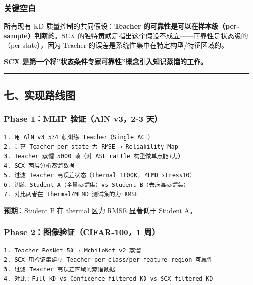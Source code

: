 \documentclass[
  12pt,
]{ctexart}
\begin{document}
\subsubsection{关键空白}\label{ux5173ux952eux7a7aux767d}

所有现有 KD 质量控制的共同假设：\textbf{Teacher
的可靠性是可以在样本级（per-sample）判断的}。SCX
的独特贡献是指出这个假设不成立------可靠性是状态级的（per-state），因为
Teacher 的误差是系统性集中在特定构型/特征区域的。

\textbf{SCX 是第一个将''状态条件专家可靠性''概念引入知识蒸馏的工作。}

\begin{center}\rule{0.5\linewidth}{0.5pt}\end{center}

\subsection{七、实现路线图}\label{ux4e03ux5b9eux73b0ux8defux7ebfux56fe}

\subsubsection{Phase 1：MLIP 验证（AlN v3，2-3
天）}\label{phase-1mlip-ux9a8cux8bc1aln-v32-3-ux5929}

\begin{verbatim}
1. 用 AlN v3 534 帧训练 Teacher（Single ACE）
2. 计算 Teacher per-state 力 RMSE → Reliability Map
3. Teacher 蒸馏 5000 帧（对 ASE rattle 构型做单点能+力）
4. SCX 两层分析蒸馏数据
5. 过滤 Teacher 高误差状态（thermal 1800K, MLMD stress10）
6. 训练 Student A（全量蒸馏集）vs Student B（去病毒蒸馏集）
7. 对比两者在 thermal/MLMD 测试集的力 RMSE
\end{verbatim}

\textbf{预期}：Student B 在 thermal 区力 RMSE 显著低于 Student A。

\subsubsection{Phase 2：图像验证（CIFAR-100，1
周）}\label{phase-2ux56feux50cfux9a8cux8bc1cifar-1001-ux5468}

\begin{verbatim}
1. Teacher ResNet-50 → MobileNet-v2 蒸馏
2. SCX 用验证集建立 Teacher per-class/per-feature-region 可靠性
3. 过滤 Teacher 高误差区域的蒸馏数据
4. 对比：Full KD vs Confidence-filtered KD vs SCX-filtered KD
\end{verbatim}
\end{document}
